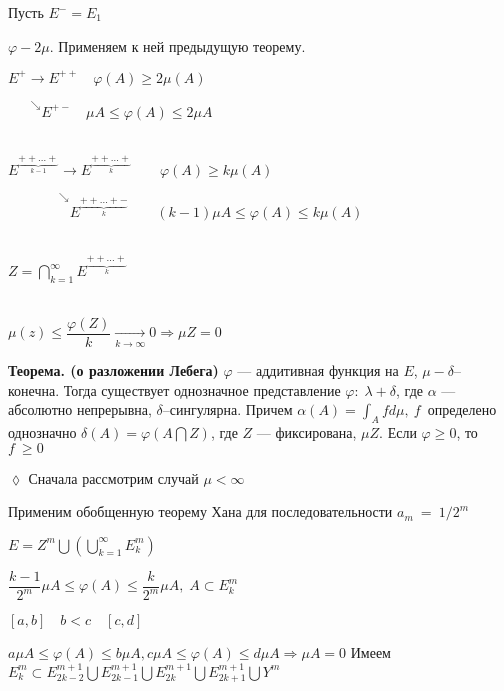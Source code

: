 Пусть $E^- = E_1$

$\varphi - 2\mu$. Применяем к ней предыдущую теорему.

$E^+ \rightarrow E^{++} \quad \varphi(A) \geqslant 2 \mu(A)$

$\phantom{E^+.}^\searrow E^{+-}  \quad \mu A \leqslant \varphi(A)
\leqslant 2 \mu A$

$\phantom{xxx}$

$E^{\underbrace{+ + \ldots +}_{k-1}} \rightarrow E^{\underbrace{+
+ \ldots +}_{k}} \quad \quad \varphi(A) \geqslant k \mu (A)$


$\phantom{E^{\underbrace{+ + \ldots +}_{k-1}}} ^\searrow
E^{\underbrace{+ + \ldots + -}_{k}} \quad \quad (k-1) \mu A
\leqslant \varphi(A) \leqslant k \mu (A)$


$\phantom{xxxx} $

$Z = \bigcap_{k=1}^{\infty} E^{\underbrace{++ \ldots +}_k}$

$\phantom{xxxx} $

$\mu(z) \leqslant \dfrac{\varphi(Z)}{k} \xrightarrow[k \rightarrow
\infty]{} 0 \Rightarrow \mu Z = 0$

\textbf{Теорема. (о разложении Лебега)} \quad  $\varphi$ ---
аддитивная функция на $E$, $\mu - \delta$--конечна. Тогда
существует однозначное представление $\varphi: \; \lambda +
\delta$, где $\alpha$ --- абсолютно непрерывна,
$\delta$--сингулярна. Причем $\alpha(A) = \int_A f d \mu, \:
f$~определено однозначно $\delta (A) = \varphi(A \bigcap Z)$, где
$Z$
--- фиксирована, $\mu Z$. Если $\varphi \geqslant 0$, то $f~\geqslant 0$

$\lozenge$ Сначала рассмотрим случай $\mu < \infty$

Применим обобщенную теорему Хана для последовательности
$a_m~=~1/2^m$

$E = Z^m \bigcup (\bigcup_{k=1}^\infty E_k^m)$

$\dfrac{k-1}{2^m} \mu A \leqslant \varphi (A) \leqslant
\dfrac{k}{2^m} \mu A, \; A \subset E_k^m$

$[a,b] \quad b<c \quad [c,d]$

$a \mu A \leqslant \varphi(A) \leqslant b \mu A, c \mu A \leqslant
\varphi(A) \leqslant d \mu A \Rightarrow \mu A = 0$
%
%
%
%
%
%
%
%
%
%
%
%
Имеем $E_k^m \subset E_{2k - 2}^{m+1} \bigcup E_{2k-1}^{m+1}
\bigcup E_{2k}^{m+1} \bigcup E_{2k + 1}^{m+1} \bigcup Y^m$

